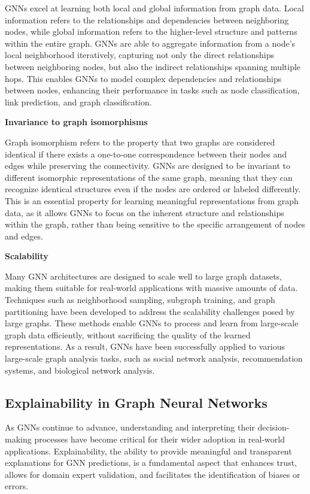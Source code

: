 \documentclass[final]{article}
\begin{document}
GNNs excel at learning both local and global information from graph data. Local information refers to the relationships and dependencies between neighboring nodes, while global information refers to the higher-level structure and patterns within the entire graph. GNNs are able to aggregate information from a node's local neighborhood iteratively, capturing not only the direct relationships between neighboring nodes, but also the indirect relationships spanning multiple hops. This enables GNNs to model complex dependencies and relationships between nodes, enhancing their performance in tasks such as node classification, link prediction, and graph classification.

\item \textbf{Invariance to graph isomorphisms}

Graph isomorphism refers to the property that two graphs are considered identical if there exists a one-to-one correspondence between their nodes and edges while preserving the connectivity. GNNs are designed to be invariant to different isomorphic representations of the same graph, meaning that they can recognize identical structures even if the nodes are ordered or labeled differently. This is an essential property for learning meaningful representations from graph data, as it allows GNNs to focus on the inherent structure and relationships within the graph, rather than being sensitive to the specific arrangement of nodes and edges.

\item \textbf{Scalability}

Many GNN architectures are designed to scale well to large graph datasets, making them suitable for real-world applications with massive amounts of data. Techniques such as neighborhood sampling, subgraph training, and graph partitioning have been developed to address the scalability challenges posed by large graphs. These methods enable GNNs to process and learn from large-scale graph data efficiently, without sacrificing the quality of the learned representations. As a result, GNNs have been successfully applied to various large-scale graph analysis tasks, such as social network analysis, recommendation systems, and biological network analysis.

\subsection{Explainability in Graph Neural Networks}
 As GNNs continue to advance, understanding and interpreting their decision-making processes have become critical for their wider adoption in real-world applications. Explainability, the ability to provide meaningful and transparent explanations for GNN predictions, is a fundamental aspect that enhances trust, allows for domain expert validation, and facilitates the identification of biases or errors.
 
\end{document}
